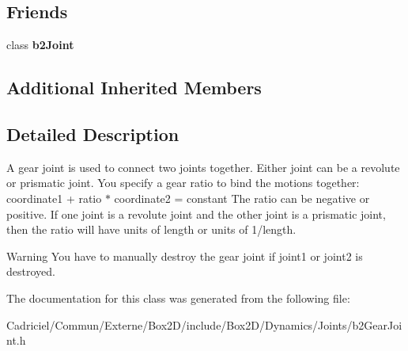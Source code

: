 \subsection*{Friends}
\begin{DoxyCompactItemize}
\item 
class {\bfseries b2\+Joint}\hypertarget{classb2_gear_joint_a54ade8ed3d794298108d7f4c4e4793fa}{}\label{classb2_gear_joint_a54ade8ed3d794298108d7f4c4e4793fa}

\end{DoxyCompactItemize}
\subsection*{Additional Inherited Members}


\subsection{Detailed Description}
A gear joint is used to connect two joints together. Either joint can be a revolute or prismatic joint. You specify a gear ratio to bind the motions together\+: coordinate1 + ratio $\ast$ coordinate2 = constant The ratio can be negative or positive. If one joint is a revolute joint and the other joint is a prismatic joint, then the ratio will have units of length or units of 1/length. \begin{DoxyWarning}{Warning}
You have to manually destroy the gear joint if joint1 or joint2 is destroyed. 
\end{DoxyWarning}


The documentation for this class was generated from the following file\+:\begin{DoxyCompactItemize}
\item 
Cadriciel/\+Commun/\+Externe/\+Box2\+D/include/\+Box2\+D/\+Dynamics/\+Joints/b2\+Gear\+Joint.\+h\end{DoxyCompactItemize}
